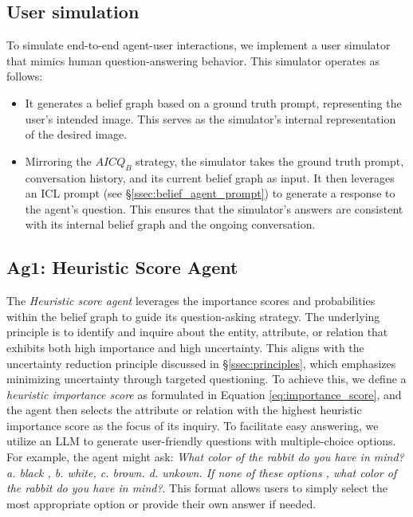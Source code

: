\subsection{User simulation} \label{ssec:user_simulation}

To simulate end-to-end agent-user interactions, we implement a user simulator that mimics human question-answering behavior. This simulator operates as follows:
\begin{itemize}
    \item  It generates a belief graph based on a ground truth prompt, representing the user's intended image. This serves as the simulator's internal representation of the desired image.
    \item Mirroring the $AICQ_{B}$ strategy, the simulator takes the ground truth prompt, conversation history, and its current belief graph as input. It then leverages an ICL prompt (see \S\ref{ssec:belief_agent_prompt}) to generate a response to the agent's question. This ensures that the simulator's answers are consistent with its internal belief graph and the ongoing conversation.
\end{itemize}


\subsection{Ag1: Heuristic Score Agent}\label{ssec:ag1}
The \textit{Heuristic score agent} leverages the importance scores and probabilities within the belief graph to guide its question-asking strategy. The underlying principle is to identify and inquire about the entity, attribute, or relation that exhibits both high importance and high uncertainty. This aligns with the uncertainty reduction principle discussed in \S\ref{ssec:principles}, which emphasizes minimizing uncertainty through targeted questioning. To achieve this, we define a \textit{heuristic importance score} as formulated in Equation \ref{eq:importance_score}, and the agent then selects the attribute or relation with the highest heuristic importance score as the focus of its inquiry. To facilitate easy answering, we utilize an LLM to generate user-friendly questions with multiple-choice options. For example, the agent might ask: \textit{What color of the rabbit do you have in mind? a. black , b. white, c. brown. d. unkown. If none of these options , what color of the rabbit do you have in mind?}. This format allows users to simply select the most appropriate option or provide their own answer if needed. 

